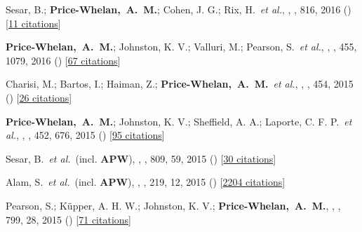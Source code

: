 {\item[{\color{deemph}\scriptsize21}]Sesar, B.; \textbf{Price-Whelan,~A.~M.}; Cohen, J. G.; Rix, H.~\textit{et al.}, , \apj, 816, 2016 () [\href{http://adsabs.harvard.edu/abs/2016ApJ...816L...4S}{11 citations}]

\item[{\color{deemph}\scriptsize20}]\textbf{Price-Whelan,~A.~M.}; Johnston, K. V.; Valluri, M.; Pearson, S.~\textit{et al.}, , \mnras, 455, 1079, 2016 () [\href{http://adsabs.harvard.edu/abs/2016MNRAS.455.1079P}{67 citations}]

\item[{\color{deemph}\scriptsize19}]Charisi, M.; Bartos, I.; Haiman, Z.; \textbf{Price-Whelan,~A.~M.}~\textit{et al.}, , \mnras, 454, 2015 () [\href{http://adsabs.harvard.edu/abs/2015MNRAS.454L..21C}{26 citations}]

\item[{\color{deemph}\scriptsize18}]\textbf{Price-Whelan,~A.~M.}; Johnston, K. V.; Sheffield, A. A.; Laporte, C. F. P.~\textit{et al.}, , \mnras, 452, 676, 2015 () [\href{http://adsabs.harvard.edu/abs/2015MNRAS.452..676P}{95 citations}]

\item[{\color{deemph}\scriptsize17}]Sesar, B.~\textit{et al.}~(incl. \textbf{APW}), , \apj, 809, 59, 2015 () [\href{http://adsabs.harvard.edu/abs/2015ApJ...809...59S}{30 citations}]

\item[{\color{deemph}\scriptsize16}]Alam, S.~\textit{et al.}~(incl. \textbf{APW}), , \apjs, 219, 12, 2015 () [\href{http://adsabs.harvard.edu/abs/2015ApJS..219...12A}{2204 citations}]

\item[{\color{deemph}\scriptsize15}]Pearson, S.; K{\"u}pper, A. H. W.; Johnston, K. V.; \textbf{Price-Whelan,~A.~M.}, , \apj, 799, 28, 2015 () [\href{http://adsabs.harvard.edu/abs/2015ApJ...799...28P}{71 citations}]

}
